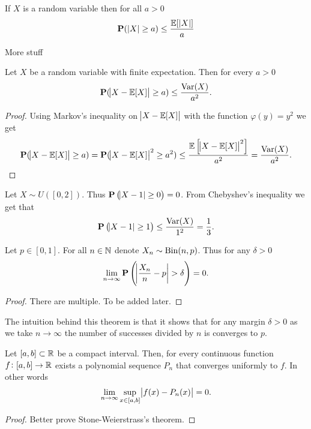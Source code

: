 \documentclass[11pt,a4paper]{article}
\begin{document}
  \begin{corollary}
    If $X$ is a random variable then for all $a > 0$
    \[
      \mathbf{P}(|X|\geq a) \leq
      \frac{\mathbb{E}[|X|]}{a}
    \]
  \end{corollary}

  More stuff

  \begin{theorem}
    Let $X$ be a random variable with finite expectation. Then for every
    $a > 0$
    \[
      \mathbf{P}(\abs{X - \mathbb{E}[X]} \geq a) \le
      \frac{\operatorname{Var}(X)}{a^2}.
    \]
  \end{theorem}
  \begin{proof}
    Using Markov's inequality on $\abs{X - \mathbb{E}[X]}$ with the function
    $\varphi(y) = y^2$ we get
    \[
      \mathbf{P}(\abs{X-\mathbb{E}[X]} \geq a) =
      \mathbf{P}(\abs{X-\mathbb{E}[X]}^{2} \geq a^{2}) \leq
      \frac{\mathbb{E}\left[\abs{X-\mathbb{E}[X]}^{2}\right]}{a^{2}} =
      \frac{\operatorname{Var}(X)}{a^2}.
    \]
  \end{proof}

  \begin{example}
    Let $X \sim U([0,2])$. Thus $\mathbf{P}\left(\abs{X - 1} \geq 0\right) = 0$.
    From Chebyshev's inequality we get that
    \[
      \mathbf{P}\left(\abs{X - 1} \geq 1\right) \le
      \frac{\operatorname{Var}(X)}{1^2} =
      \frac{1}{3}.
    \]
  \end{example}

  \begin{theorem}
    Let $p \in [0,1]$. For all $n \in \mathbb{N}$ denote $X_n \sim \operatorname{Bin}(n,p)$.
    Thus for any $\delta > 0$
    \[
      \lim_{n \to \infty}
      \mathbf{P}\left(\abs{\frac{X_n}{n} - p} > \delta\right) =
      0.
    \]
  \end{theorem}
  \begin{proof}
    There are multiple. To be added later.
  \end{proof}

  The intuition behind this theorem is that it shows that for any margin
  $\delta > 0$ as we take $n \to \infty$ the number of successes divided
  by $n$ is converges to $p$.

  \begin{theorem}
    Let $[a,b] \subset \mathbb{R}$ be a compact interval. Then, for every continuous
    function $f \colon [a,b] \to \mathbb{R}$ exists a polynomial sequence $P_n$
    that converges uniformly to $f$. In other words
    \[
      \lim_{n \to \infty}
      \sup_{x \in [a,b]}
      \abs{f(x) - P_n(x)} =
      0.
    \]
  \end{theorem}
  \begin{proof}
    Better prove Stone-Weierstrass's theorem.
  \end{proof}
\end{document}
